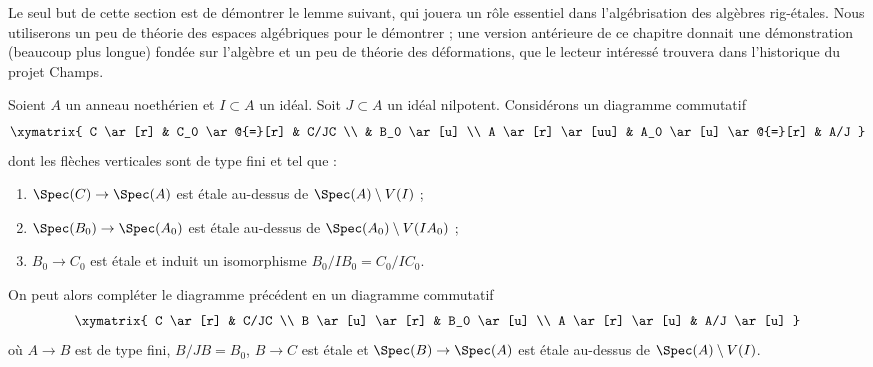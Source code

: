 \noindent
Le seul but de cette section est de démontrer le lemme suivant, qui jouera un
rôle essentiel dans l'algébrisation des algèbres rig-étales. Nous utiliserons
un peu de théorie des espaces algébriques pour le démontrer ; une version
antérieure de ce chapitre donnait une démonstration (beaucoup plus longue)
fondée sur l'algèbre et un peu de théorie des déformations, que le lecteur
intéressé trouvera dans l'historique du projet Champs.

\begin{lemma}
\label{lemma-lift-approximation}
Soient $A$ un anneau noethérien et $I \subset A$ un idéal. Soit
$J \subset A$ un idéal nilpotent. Considérons un diagramme commutatif
$$
\xymatrix{
C \ar[r] & C_0 \ar@{=}[r] & C/JC \\
& B_0 \ar[u] \\
A \ar[r] \ar[uu] & A_0 \ar[u] \ar@{=}[r] & A/J
}
$$
dont les flèches verticales sont de type fini et tel que :
\begin{enumerate}
\item $\Spec(C) \to \Spec(A)$ est étale au-dessus de
$\Spec(A) \setminus V(I)$ ;
\item $\Spec(B_0) \to \Spec(A_0)$ est étale au-dessus de
$\Spec(A_0) \setminus V(IA_0)$ ;
\item $B_0 \to C_0$ est étale et induit un isomorphisme
$B_0/IB_0 = C_0/IC_0$.
\end{enumerate}
On peut alors compléter le diagramme précédent en un diagramme commutatif
$$
\xymatrix{
C \ar[r] & C/JC \\
B \ar[u] \ar[r] & B_0 \ar[u] \\
A \ar[r] \ar[u] & A/J \ar[u]
}
$$
où $A \to B$ est de type fini, $B/JB = B_0$, $B \to C$ est étale et
$\Spec(B) \to \Spec(A)$ est étale au-dessus de
$\Spec(A) \setminus V(I)$.
\end{lemma}

